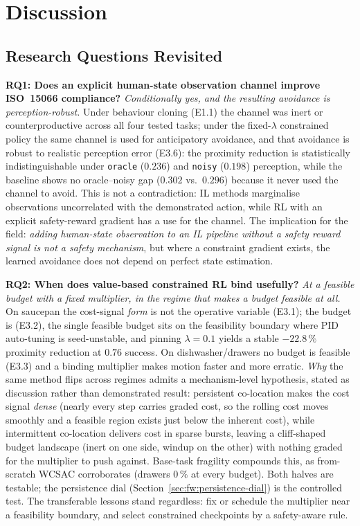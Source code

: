 \documentclass[11pt,a4paper]{report}
\newcommand{\iso}{ISO~15066}
\begin{document}
\chapter{Discussion}
\label{ch:disc}

\section{Research Questions Revisited}
\label{sec:disc:rqs-revisited}

\textbf{RQ1: Does an explicit human-state observation channel
improve \iso{} compliance?} \emph{Conditionally yes, and the resulting
avoidance is perception-robust.} Under behaviour cloning (E1.1) the
channel was inert or counterproductive across all four tested tasks;
under the fixed-$\lambda$ constrained policy the same channel is used
for anticipatory avoidance, and that avoidance is robust to realistic
perception error (E3.6): the proximity reduction is statistically
indistinguishable under \texttt{oracle} ($0.236$) and \texttt{noisy}
($0.198$) perception, while the baseline shows no oracle--noisy gap
($0.302$ vs.\ $0.296$) because it never used the channel to avoid.
This is not a contradiction: IL methods marginalise observations
uncorrelated with the demonstrated action, while RL with an explicit
safety-reward gradient has a use for the channel. The implication for
the field: \emph{adding human-state observation to an IL pipeline
without a safety reward signal is not a safety mechanism}, but where a
constraint gradient exists, the learned avoidance does not depend on
perfect state estimation.

\textbf{RQ2: When does value-based constrained RL bind usefully?}
\emph{At a feasible budget with a fixed multiplier, in the regime
that makes a budget feasible at all.} On saucepan the cost-signal
\emph{form} is not the operative variable (E3.1); the budget is
(E3.2), the single feasible budget sits on the feasibility boundary
where PID auto-tuning is seed-unstable, and pinning $\lambda = 0.1$
yields a stable $-22.8\,\%$ proximity reduction at $0.76$ success.
On dishwasher/drawers no budget is feasible (E3.3) and a binding
multiplier makes motion faster and more erratic. \emph{Why} the same
method flips across regimes admits a mechanism-level hypothesis,
stated as discussion rather than demonstrated result: persistent
co-location makes the cost signal \emph{dense} (nearly every step
carries graded cost, so the rolling cost moves smoothly and a
feasible region exists just below the inherent cost), while
intermittent co-location delivers cost in sparse bursts, leaving a
cliff-shaped budget landscape (inert on one side, windup on the
other) with nothing graded for the multiplier to push against.
Base-task fragility compounds this, as from-scratch WCSAC
corroborates (drawers $0\,\%$ at every budget). Both halves are
testable; the persistence dial
(Section~\ref{sec:fw:persistence-dial}) is the controlled test. The
transferable lessons stand regardless: fix or schedule the
multiplier near a feasibility boundary, and select constrained
checkpoints by a safety-aware rule.
\end{document}
